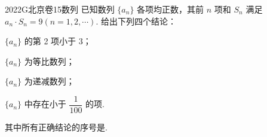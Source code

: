 
\begin{problem}{2022}{G}{北京卷}{15}{数列}
已知数列 $\{a_n\}$ 各项均正数，其前 $n$ 项和 $S_n$ 满足 $a_n \cdot S_n = 9(n=1,2,\cdots)$. 给出下列四个结论：

 $\{a_n\}$ 的第 2 项小于 3；

 $\{a_n\}$ 为等比数列；

 $\{a_n\}$ 为递减数列；

 $\{a_n\}$ 中存在小于 $\dfrac{1}{100}$ 的项.

其中所有正确结论的序号是\underline{\hspace{4em}}.
\end{problem}